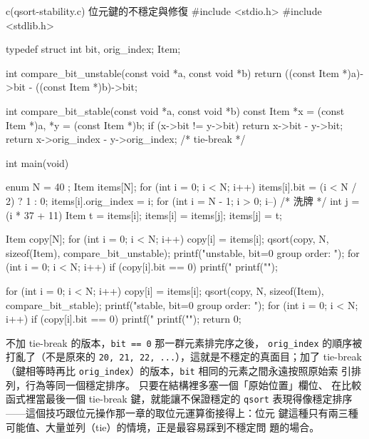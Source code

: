 \begin{example}{c}{(qsort-stability.c) 位元鍵的不穩定與修復}
#include <stdio.h>
#include <stdlib.h>

typedef struct { int bit, orig_index; } Item;

int compare_bit_unstable(const void *a, const void *b) {
    return ((const Item *)a)->bit - ((const Item *)b)->bit;
}

int compare_bit_stable(const void *a, const void *b) {
    const Item *x = (const Item *)a, *y = (const Item *)b;
    if (x->bit != y->bit) return x->bit - y->bit;
    return x->orig_index - y->orig_index; /* tie-break */
}

int main(void) {
    enum { N = 40 };
    Item items[N];
    for (int i = 0; i < N; i++) {
        items[i].bit = (i < N / 2) ? 1 : 0;
        items[i].orig_index = i;
    }
    for (int i = N - 1; i > 0; i--) { /* 洗牌 */
        int j = (i * 37 + 11) %
        Item t = items[i]; items[i] = items[j]; items[j] = t;
    }

    Item copy[N];
    for (int i = 0; i < N; i++) copy[i] = items[i];
    qsort(copy, N, sizeof(Item), compare_bit_unstable);
    printf("unstable, bit=0 group order: ");
    for (int i = 0; i < N; i++) if (copy[i].bit == 0) printf("%
    printf("\n");

    for (int i = 0; i < N; i++) copy[i] = items[i];
    qsort(copy, N, sizeof(Item), compare_bit_stable);
    printf("stable, bit=0 group order:   ");
    for (int i = 0; i < N; i++) if (copy[i].bit == 0) printf("%
    printf("\n");
    return 0;
}
\end{example}


不加 tie-break 的版本，\texttt{bit == 0} 那一群元素排完序之後，
\texttt{orig\_index} 的順序被打亂了（不是原來的 \texttt{20, 21, 22,
...}），這就是不穩定的真面目；加了 tie-break（鍵相等時再比
\texttt{orig\_index}）的版本，\texttt{bit} 相同的元素之間永遠按照原始索
引排列，行為等同一個穩定排序。 只要在結構裡多塞一個「原始位置」欄位、
在比較函式裡當最後一個 tie-break 鍵，就能讓不保證穩定的 \texttt{qsort}
表現得像穩定排序——這個技巧跟位元操作那一章的取位元運算銜接得上：位元
鍵這種只有兩三種可能值、大量並列（tie）的情境，正是最容易踩到不穩定問
題的場合。

